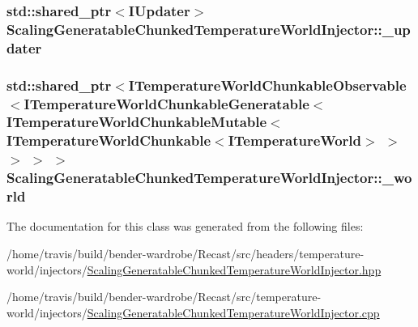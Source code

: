 \hypertarget{class_scaling_generatable_chunked_temperature_world_injector_aa94745f5caba594ed9dcfbfc21685358}{
\subsubsection[{\-\_\-updater}]{\setlength{\rightskip}{0pt plus 5cm}std\-::shared\-\_\-ptr$<${\bf I\-Updater}$>$ Scaling\-Generatable\-Chunked\-Temperature\-World\-Injector\-::\-\_\-updater\hspace{0.3cm}{\ttfamily [protected]}}}\label{class_scaling_generatable_chunked_temperature_world_injector_aa94745f5caba594ed9dcfbfc21685358}
\hypertarget{class_scaling_generatable_chunked_temperature_world_injector_a8af169452d94765c5bdd6302f5420ebb}{
\subsubsection[{\-\_\-world}]{\setlength{\rightskip}{0pt plus 5cm}std\-::shared\-\_\-ptr$<${\bf I\-Temperature\-World\-Chunkable\-Observable}$<${\bf I\-Temperature\-World\-Chunkable\-Generatable}$<${\bf I\-Temperature\-World\-Chunkable\-Mutable}$<${\bf I\-Temperature\-World\-Chunkable}$<${\bf I\-Temperature\-World}$>$ $>$ $>$ $>$ $>$ Scaling\-Generatable\-Chunked\-Temperature\-World\-Injector\-::\-\_\-world\hspace{0.3cm}{\ttfamily [protected]}}}\label{class_scaling_generatable_chunked_temperature_world_injector_a8af169452d94765c5bdd6302f5420ebb}


The documentation for this class was generated from the following files\-:\begin{DoxyCompactItemize}
\item 
/home/travis/build/bender-\/wardrobe/\-Recast/src/headers/temperature-\/world/injectors/\hyperlink{_scaling_generatable_chunked_temperature_world_injector_8hpp}{Scaling\-Generatable\-Chunked\-Temperature\-World\-Injector.\-hpp}\item 
/home/travis/build/bender-\/wardrobe/\-Recast/src/temperature-\/world/injectors/\hyperlink{_scaling_generatable_chunked_temperature_world_injector_8cpp}{Scaling\-Generatable\-Chunked\-Temperature\-World\-Injector.\-cpp}\end{DoxyCompactItemize}
